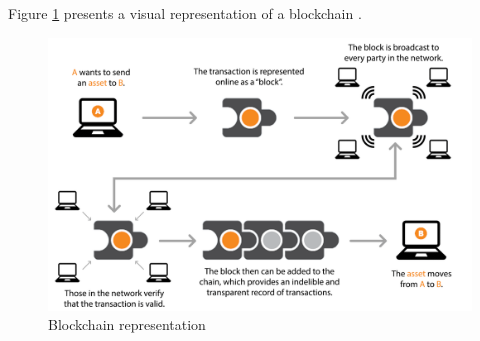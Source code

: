Figure \ref{fig:blockchain} presents a visual representation of a blockchain \cite{tian2017supply}.

\begin{figure}[htbp]
\begin{center}
  \includegraphics[scale=0.35]{images/blockchain.png}
\caption{Blockchain representation \cite{michael2018blockchain}}
\label{fig:blockchain}
\end{center}
\end{figure}
